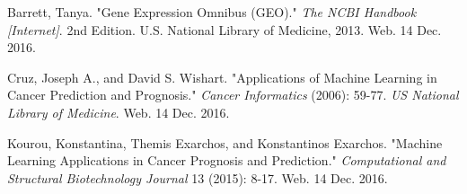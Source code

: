 \documentclass[12pt]{scrartcl}
\begin{document}
    

    
    
    \begin{thebibliography}{9}

Barrett, Tanya. "Gene Expression Omnibus (GEO)." \textit{The NCBI Handbook [Internet]}. 2nd Edition. U.S. National Library of Medicine, 2013. Web. 14 Dec. 2016.

Cruz, Joseph A., and David S. Wishart. "Applications of Machine Learning in Cancer Prediction and Prognosis." \textit{Cancer Informatics} (2006): 59-77. \textit{US National Library of Medicine}. Web. 14 Dec. 2016.

Kourou, Konstantina, Themis Exarchos, and Konstantinos Exarchos. "Machine Learning Applications in Cancer Prognosis and Prediction." \textit{Computational and Structural Biotechnology Journal} 13 (2015): 8-17. Web. 14 Dec. 2016.

\end{thebibliography}
    
\end{document}
